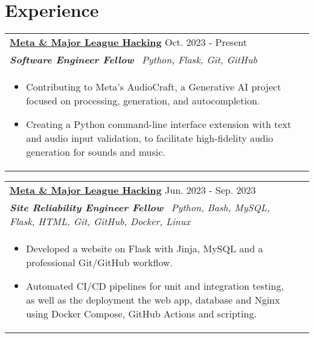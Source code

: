 \documentclass[a4paper,8pt]{article}
\begin{document}
\section{Experience}
\begin{tabularx}{\linewidth}{ @{}l r@{} }
\textbf{\uline{\href{https://github.com/}{Meta \& Major League Hacking}}} \hfill \color[HTML]{371e77} Oct. 2023 - Present \\[4pt]
\color[HTML]{371e77}\textbf{\textit{Software Engineer Fellow}}\ \hfill \color[HTML]{4B28A4} \textit{Python, Flask, Git, GitHub} \\[5pt]
\begin{minipage}[t]{\linewidth}
    \begin{itemize}[nosep,after=\strut, leftmargin=2em, itemsep=2pt]
        \item Contributing to Meta's AudioCraft, a Generative AI project focused on processing, generation, and autocompletion.
        \item Creating a Python command-line interface extension with text and audio input validation, to facilitate high-fidelity audio generation for sounds and music.
    \end{itemize}
\end{minipage}
\end{tabularx}

\begin{tabularx}{\linewidth}{ @{}l r@{} }
\color[HTML]{1C033C} \textbf{\uline{\href{https://github.com/}{Meta \& Major League Hacking}}} \hfill \color[HTML]{371e77} Jun. 2023 - Sep. 2023 \\[4pt]
\color[HTML]{371e77}\textbf{\textit{Site Reliability Engineer Fellow}}\ \hfill \color[HTML]{4B28A4} \textit{Python, Bash, MySQL, Flask, HTML, Git, GitHub, Docker, Linux} \\[5pt]
\begin{minipage}[t]{\linewidth}
    \begin{itemize}[nosep,after=\strut, leftmargin=2em, itemsep=2pt]
        \item Developed a website on Flask with Jinja, MySQL and a professional Git/GitHub workflow.
        \item Automated CI/CD pipelines for unit and integration testing, as well as the deployment the web app, database and Nginx using Docker Compose, GitHub Actions and scripting.
    \end{itemize}
\end{minipage}
\end{tabularx}
\end{document}

